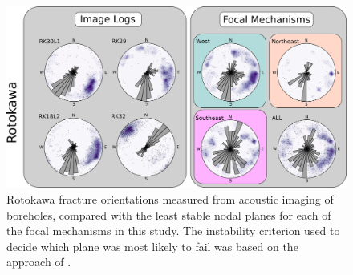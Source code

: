 \begin{figure}
\begin{center}
\includegraphics[width=\textwidth,height=\textheight,keepaspectratio]{Chapter_5_FMs/figures/Rot_fracture_FM/ALL_fracs_and_FMs_Rotokawa}
\caption[Rotokawa fracture orientations and focal mechanism nodal planes]{{
Rotokawa fracture orientations measured from acoustic imaging of boreholes, compared with the least stable nodal planes for each of the focal mechanisms in this study. The instability criterion used to decide which plane was most likely to fail was based on the approach of \citet{vavryvcuk2014iterative}.
{\label{237919}}%
}}
\end{center}
\end{figure}

